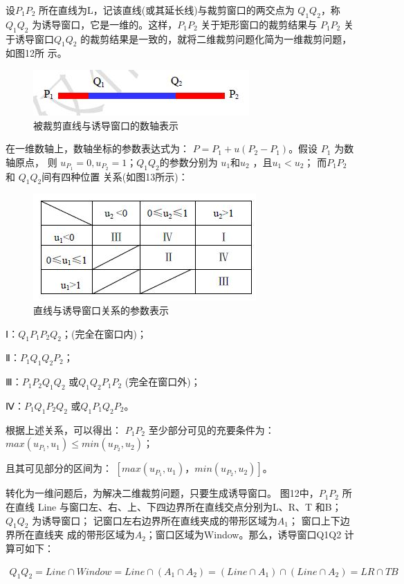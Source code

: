 \documentclass[a4paper,UTF8]{article}
\theoremstyle{definition}
\begin{document}
设$P_1P_2$ 所在直线为L，记该直线(或其延长线)与裁剪窗口的两交点为
$Q_1Q_2$，称$Q_1Q_2$
为诱导窗口，它是一维的。这样，$P_1P_2$ 关于矩形窗口的裁剪结果与
$P_1P_2$ 关于诱导窗口$Q_1Q_2$ 的裁剪结果是一致的，就将二维裁剪问题化简为一维裁剪问题，如图12所
示。
\begin{figure}[h]

    \centering
    \includegraphics[width = .5\textwidth]{12.jpg}
    \caption{被裁剪直线与诱导窗口的数轴表示}
    \label{fig:label12}
\end{figure}
在一维数轴上，数轴坐标的参数表达式为：
$P=P_1+u(P_2-P_1)$。假设 $P_1$ 为数轴原点，
则 $u_{P_1}=0,u_{P_2}=1$；$Q_1Q_2$的参数分别为
$u_1$和$u_2$ ，且$u_1<u_2$；
而$ P_1P_2$和 $Q_1Q_2$间有四种位置
关系(如图13所示)：
\begin{figure}[h]

    \centering
    \includegraphics[width = .5\textwidth]{13.jpg}
    \caption{直线与诱导窗口关系的参数表示}
    \label{fig:label13}
\end{figure}
Ⅰ：$Q_1P_1P_2Q_2$；(完全在窗口内)；

Ⅱ：$P_1Q_1Q_2P_2$；

Ⅲ：$P_1P_2Q_1Q_2$ 或$Q_1Q_2P_1P_2$ (完全在窗口外)；

Ⅳ：$P_1Q_1P_2Q_2$ 或$Q_1P_1Q_2P_2$。

根据上述关系，可以得出：
$P_1P_2$ 至少部分可见的充要条件为：
$max(u_{P_1},u_1) \leq min(u_{P_2},u_2)$；

且其可见部分的区间为：
$[max(u_{P_1},u_1)，min(u_{P_2},u_2)]$。

转化为一维问题后，为解决二维裁剪问题，只要生成诱导窗口。
图12中，$P_1P_2$
所在直线 Line 与窗口左、右、上、下四边界所在直线交点分别为L、R、T 和B；$Q_1Q_2$
为诱导窗口；
记窗口左右边界所在直线夹成的带形区域为$A_1$；
窗口上下边界所在直线夹
成的带形区域为$A_2$；窗口区域为Window。那么，诱导窗口Q1Q2 计算可如下：

\begin{align}
    Q_1Q_2= Line \cap Window=Line \cap (A_1 \cap A_2)= (Line \cap A_1) \cap (Line \cap A_2)=LR \cap TB
\end{align}
\end{document}
